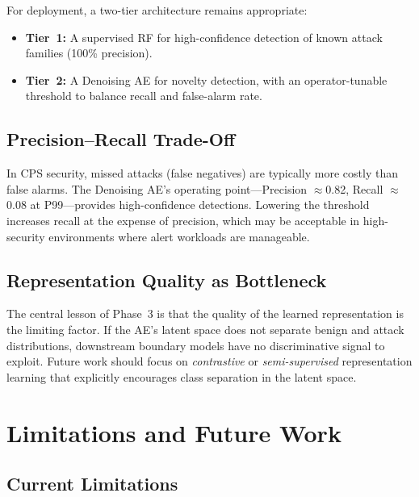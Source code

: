 \documentclass[10pt,conference]{IEEEtran}
\begin{document}
For deployment, a two-tier architecture remains appropriate:
\begin{itemize}[leftmargin=*,noitemsep]
  \item \textbf{Tier~1:} A supervised RF for high-confidence detection
        of known attack families (100\% precision).
  \item \textbf{Tier~2:} A Denoising AE for novelty detection, with an
        operator-tunable threshold to balance recall and false-alarm
        rate.
\end{itemize}

\subsection{Precision--Recall Trade-Off}

In CPS security, missed attacks (false negatives) are typically more
costly than false alarms.  The Denoising AE's operating point---Precision
$\approx$0.82, Recall $\approx$0.08 at P99---provides high-confidence
detections.  Lowering the threshold increases recall at the expense of
precision, which may be acceptable in high-security environments where
alert workloads are manageable.

\subsection{Representation Quality as Bottleneck}

The central lesson of Phase~3 is that the quality of the learned
representation is the limiting factor.  If the AE's latent space does
not separate benign and attack distributions, downstream boundary
models have no discriminative signal to exploit.  Future work should
focus on \emph{contrastive} or \emph{semi-supervised} representation
learning that explicitly encourages class separation in the latent
space.

\section{Limitations and Future Work}
\label{sec:limits}

\subsection{Current Limitations}
\end{document}
